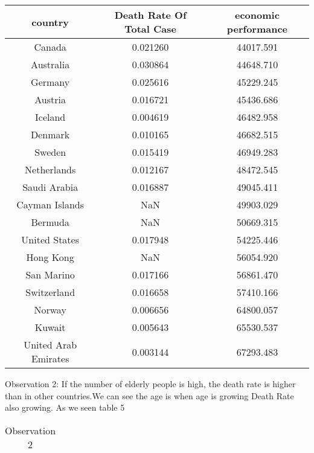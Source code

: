 \documentclass[a4 paper]{article}
\newcommand{\0}{\mathbf{0}}
\begin{document}
\begin{itemize}
\begin{table}[!ht]
\begin{tabular}{|c|c|c|}
        country & Death Rate Of Total Case & economic performance \\\hline
        Canada  & 0.021260 & 44017.591 \\\hline
        Australia & 0.030864 & 44648.710\\\hline
        Germany & 0.025616 & 45229.245\\\hline
        Austria & 0.016721 & 45436.686\\\hline
        Iceland & 0.004619 & 46482.958\\\hline
        Denmark & 0.010165 & 46682.515\\\hline
        Sweden & 0.015419 & 46949.283\\\hline
        Netherlands & 0.012167 & 48472.545\\\hline
        Saudi Arabia & 0.016887 & 49045.411\\\hline
        Cayman Islands &  NaN & 49903.029\\\hline
        Bermuda & NaN & 50669.315\\\hline
        United States  & 0.017948 & 54225.446\\\hline
        Hong Kong & NaN & 56054.920\\\hline
        San Marino & 0.017166 & 56861.470\\\hline
        Switzerland & 0.016658 & 57410.166\\\hline
        Norway & 0.006656 & 64800.057\\\hline
        Kuwait & 0.005643 & 65530.537\\\hline
        United Arab Emirates & 0.003144 & 67293.483\\\hline

	\end{tabular}
    \end{table}
	
	\newline
	Observation 2:\newline
	If the number of elderly people is high, the death rate is higher than in other countries.We can see the age is when age is growing Death Rate also growing. As we seen table 5\newline
	
	\begin{table}[!ht]
    \centering
    \caption{Observation 2}
    \label{tab:Ob2}
    \begin{tabular}{|c|c|c|}
    \hline
    

\end{tabular}
\end{table}
\end{itemize}
\end{document}
